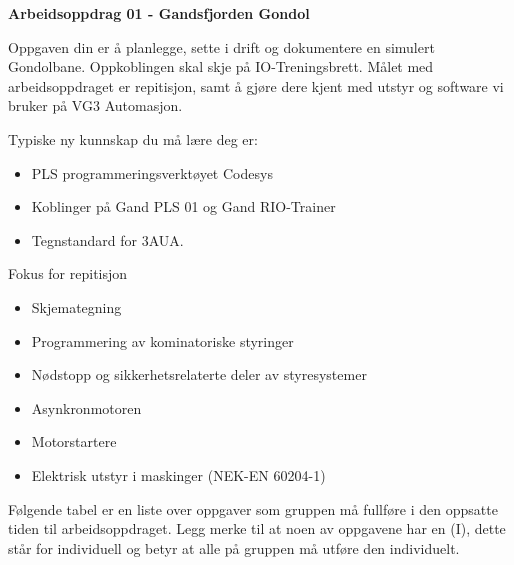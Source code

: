 
\noindent
{\bf Arbeidsoppdrag 01 - Gandsfjorden Gondol}

\vskip 5pt

Oppgaven din er å planlegge, sette i drift og dokumentere en simulert Gondolbane. Oppkoblingen skal skje på IO-Treningsbrett. Målet med arbeidsoppdraget er repitisjon, samt å gjøre dere kjent med utstyr og software vi bruker på VG3 Automasjon. 

\vskip 5pt

Typiske ny kunnskap du må lære deg er:
\begin{itemize}[noitemsep]
	\item PLS programmeringsverktøyet Codesys
	\item Koblinger på Gand PLS 01 og Gand RIO-Trainer
	\item Tegnstandard for 3AUA. 
\end{itemize}

Fokus for repitisjon
\begin{itemize}[noitemsep]
	\item Skjemategning
	\item Programmering av kominatoriske styringer
	\item Nødstopp og sikkerhetsrelaterte deler av styresystemer
	\item Asynkronmotoren
	\item Motorstartere
	\item Elektrisk utstyr i maskinger (NEK-EN 60204-1)
\end{itemize}

\vskip 5pt
Følgende tabel er en liste over oppgaver som gruppen må fullføre i den oppsatte tiden til arbeidsoppdraget. Legg merke til at noen av oppgavene har en (I), dette står for individuell og betyr at alle på gruppen må utføre den individuelt.

\vskip 5pt


